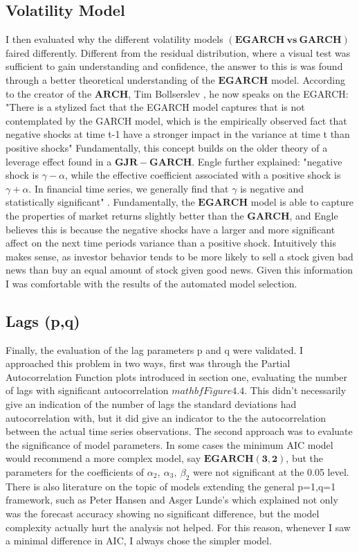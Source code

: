 \subsection{Volatility Model}

I then evaluated why the different volatility models $\mathbf{(EGARCH~vs~GARCH)}$ faired differently. Different from the residual distribution, where a visual test was sufficient to gain understanding and confidence, the answer to this is was found through a better theoretical understanding of the $\mathbf{EGARCH}$ model. According to the creator of the $\mathbf{ARCH}$, Tim Bollserslev \cite{BOLLERSLEV1986307}, he now speaks on the EGARCH: "There is a stylized fact that the EGARCH model captures that is not contemplated by the GARCH model, which is the empirically observed fact that negative shocks at time t-1 have a stronger impact in the variance at time t than positive shocks" \cite{engle} Fundamentally, this concept builds on the older theory of a leverage effect found in a $\mathbf{GJR-GARCH}$. Engle further explained: "negative shock is $\gamma-\alpha$, while the effective coefficient associated with a positive shock is $\gamma+\alpha$. In financial time series, we generally find that $\gamma$ is negative and statistically significant" \cite{engle}. Fundamentally, the $\mathbf{EGARCH}$ model is able to capture the properties of market returns slightly better than the $\mathbf{GARCH}$, and Engle believes this is because the negative shocks have a larger and more significant affect on the next time periods variance than a positive shock. Intuitively this makes sense, as investor behavior tends to be more likely to sell a stock given bad news than buy an equal amount of stock given good news. Given this information I was comfortable with the results of the automated model selection.

\subsection{Lags (p,q)}

Finally, the evaluation of the lag parameters p and q were validated. I approached this problem in two ways, first was through the Partial Autocorrelation Function plots introduced in section one, evaluating the number of lags with significant autocorrelation $mathbf{Figure 4.4}$. This didn't necessarily give an indication of the number of lags the standard deviations had autocorrelation with, but it did give an indicator to the the autocorrelation between the actual time series observations. The second approach was to evaluate the significance of model parameters. In some cases the minimum AIC model would recommend a more complex model, say $\mathbf{EGARCH(3,2)}$, but the parameters for the coefficients of $\alpha_2,~\alpha_3,~\beta_2$ were not significant at the 0.05 level. There is also literature on the topic of models extending the general p=1,q=1 framework, such as Peter Hansen and Asger Lunde's \cite{Hansen11} which explained not only was the forecast accuracy showing no significant difference, but the model complexity actually hurt the analysis not helped. For this reason, whenever I saw a minimal difference in AIC, I always chose the simpler model.  

